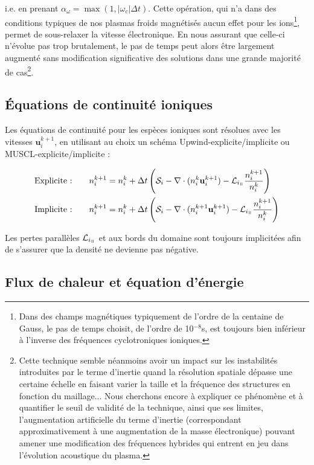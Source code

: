 \begin{refsection}
i.e. en prenant $\alpha_\omega=\max(1,|\omega_c|\Delta t)$.
Cette opération, qui n'a dans des conditions typiques de nos plasmas froids
magnétisés aucun effet pour les ions\footnote{Dans des champs magnétiques
typiquement de l'ordre de la centaine de Gauss, le pas de temps choisit, de l'ordre de 10$^{-8}$s, est toujours bien
inférieur à l'inverse des fréquences cyclotroniques ioniques.}, permet de
sous-relaxer la vitesse électronique. En nous assurant
que celle-ci n'évolue pas trop brutalement, le pas de temps peut alors être
largement augmenté sans modification significative des solutions dans une
grande majorité de cas\footnote{Cette
technique semble néanmoins avoir un impact sur les
instabilités introduites par le terme d'inertie quand la résolution spatiale
dépasse une certaine échelle en faisant varier la taille et la fréquence des
structures en fonction du maillage...
Nous cherchons encore à expliquer ce phénomène et à quantifier le seuil de
validité de la technique, ainsi que ses limites, l'augmentation artificielle du
terme d'inertie (correspondant approximativement à une augmentation de la masse
électronique) pouvant amener une modification des fréquences hybrides qui entrent en jeu dans
l'évolution acoustique du plasma.}.

\subsection{Équations de continuité ioniques}
Les équations de continuité pour les espèces ioniques sont résolues avec les
vitesses $\mathbf u_i^{k+1}$, en utilisant au choix un schéma
Upwind-explicite/implicite ou MUSCL-explicite/implicite :

\begin{align}
\text{Explicite :\qquad}& n_i^{k+1}=n_i^{k}+\Delta
t\left(\mathcal S_i-\nabla\cdot(n_i^{k}\mathbf
u_i^{k+1})-\mathcal L_{i_\para}\frac{n_i^{k+1}}{n_i^k}\right)\\
\text{Implicite :\qquad}&n_i^{k+1}=n_i^{k}+\Delta
t\left(\mathcal S_i-\nabla\cdot(n_i^{k+1}\mathbf
u_i^{k+1})-\mathcal L_{i_\para}\frac{n_i^{k+1}}{n_i^k}\right)
\end{align}

Les pertes parallèles $\mathcal {L}_{i_\para}$ et aux bords du
domaine sont toujours implicitées afin de s'assurer que la densité ne devienne
pas négative.

\subsection{Flux de chaleur et équation d'énergie}


\end{refsection}
